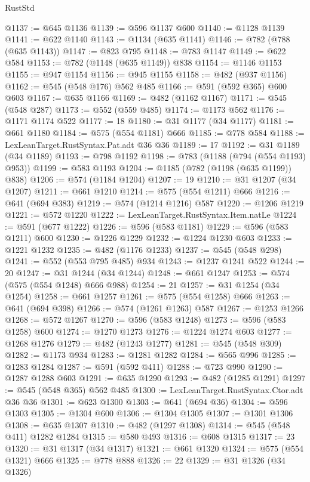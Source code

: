 \begin{lexlean}{RustStd}
\begin{coremodule}
@1137 := @645 @1136
@1139 := @596 @1137 @600
@1140 := @1128 @1139
@1141 := @622 @1140
@1143 := @1134 (@635 @1141)
@1146 := @782 (@788 (@635 @1143))
@1147 := @823 @795
@1148 := @783 @1147
@1149 := @622 @584
@1153 := @782 (@1148 (@635 @1149)) @838
@1154 := @1146 @1153
@1155 := @947 @1154
@1156 := @945 @1155
@1158 := @482 (@937 @1156)
@1162 := @545 (@548 @176) @562 @485
@1166 := @591 (@592 @365) @600 @603
@1167 := @635 @1166
@1169 := @482 (@1162 @1167)
@1171 := @545 (@548 @287)
@1173 := @552 (@559 @485)
@1174 := @1173 @562
@1176 := @1171 @1174 @522
@1177 := 18
@1180 := @31 @1177 (@34 @1177)
@1181 := @661 @1180
@1184 := @575 (@554 @1181) @666
@1185 := @778 @584
@1188 := LexLeanTarget.RustSyntax.Pat.adt @36 @36
@1189 := 17
@1192 := @31 @1189 (@34 @1189)
@1193 := @798 @1192
@1198 := @783 (@1188 (@794 (@554 @1193) @953))
@1199 := @583 @1193
@1204 := @1185 (@782 (@1198 (@635 @1199)) @838)
@1206 := @574 (@1184 @1204)
@1207 := 19
@1210 := @31 @1207 (@34 @1207)
@1211 := @661 @1210
@1214 := @575 (@554 @1211) @666
@1216 := @641 (@694 @383)
@1219 := @574 (@1214 @1216) @587
@1220 := @1206 @1219
@1221 := @572 @1220
@1222 := LexLeanTarget.RustSyntax.Item.natLe
@1224 := @591 (@677 @1222)
@1226 := @596 (@583 @1181)
@1229 := @596 (@583 @1211) @600
@1230 := @1226 @1229
@1232 := @1224 @1230 @603
@1233 := @1221 @1232
@1235 := @482 (@1176 @1233)
@1237 := @545 (@548 @298)
@1241 := @552 (@553 @795 @485) @934
@1243 := @1237 @1241 @522
@1244 := 20
@1247 := @31 @1244 (@34 @1244)
@1248 := @661 @1247
@1253 := @574 (@575 (@554 @1248) @666 @988)
@1254 := 21
@1257 := @31 @1254 (@34 @1254)
@1258 := @661 @1257
@1261 := @575 (@554 @1258) @666
@1263 := @641 (@694 @398)
@1266 := @574 (@1261 @1263) @587
@1267 := @1253 @1266
@1268 := @572 @1267
@1270 := @596 (@583 @1248)
@1273 := @596 (@583 @1258) @600
@1274 := @1270 @1273
@1276 := @1224 @1274 @603
@1277 := @1268 @1276
@1279 := @482 (@1243 @1277)
@1281 := @545 (@548 @309)
@1282 := @1173 @934
@1283 := @1281 @1282
@1284 := @565 @996
@1285 := @1283 @1284
@1287 := @591 (@592 @411)
@1288 := @723 @990
@1290 := @1287 @1288 @603
@1291 := @635 @1290
@1293 := @482 (@1285 @1291)
@1297 := @545 (@548 @365) @562 @485
@1300 := LexLeanTarget.RustSyntax.Ctor.adt @36 @36
@1301 := @623 @1300
@1303 := @641 (@694 @36)
@1304 := @596 @1303
@1305 := @1304 @600
@1306 := @1304 @1305
@1307 := @1301 @1306
@1308 := @635 @1307
@1310 := @482 (@1297 @1308)
@1314 := @545 (@548 @411) @1282 @1284
@1315 := @580 @493
@1316 := @608 @1315
@1317 := 23
@1320 := @31 @1317 (@34 @1317)
@1321 := @661 @1320
@1324 := @575 (@554 @1321) @666
@1325 := @778 @888
@1326 := 22
@1329 := @31 @1326 (@34 @1326)

\end{coremodule}
\end{lexlean}
